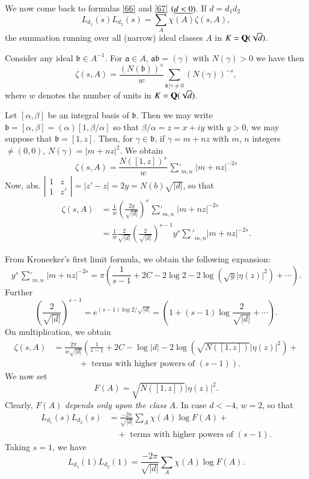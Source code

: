We now come back to formulas \eqref{66} and \eqref{67}
$(\underline{d<0})$. If $d=d_{1}d_{2}$
$$
L_{d_{1}}(s)L_{d_{2}}(s)=\sum_{A}\chi(A)\zeta(s,A),
$$
the summation running over all (narrow) ideal classes $A$ in
$K=\mathbf{Q}(\sqrt{d})$. 

Consider any ideal $\mathfrak{b}\in A^{-1}$. For $\mathfrak{a}\in A$,
$\mathfrak{a}\mathfrak{b}=(\gamma)$ with $N(\gamma)>0$ we have then
$$
\zeta(s,A)=\frac{(N(\mathfrak{b}))^{s}}{w}\sum_{\mathfrak{b}|\gamma\neq
  0}(N(\gamma))^{-s}, 
$$
where $w$ denotes the number of units in $K=\mathbf{Q}(\sqrt{d})$.

Let $[\alpha,\beta]$ be an integral basis of $\mathfrak{b}$. Then we
may write $\mathfrak{b}=[\alpha,\beta]=(\alpha)[1,\beta/\alpha]$ so
that $\beta/\alpha=z=x+iy$ with $y>0$, \ie we may suppose that
$\mathfrak{b}=[1,z]$. Then, for $\gamma\in\mathfrak{b}$, if
$\gamma=m+nz$ with $m$, $n$ integers $\neq (0,0)$,
$N(\gamma)=|m+nz|^{2}$. We obtain
$$
\zeta(s,A)=\frac{N([1,z])^{s}}{w}\mathop{{\sum}'}_{m,n}|m+nz|^{-2s}
$$
Now, abs. $\left|\begin{smallmatrix} 1& z\\ 1 &
z'\end{smallmatrix}\right|=|z'-z|=2y=N(b)\sqrt{|d|}$, so that
\begin{align*}
\zeta(s,A) &=
\frac{1}{w}\left(\frac{2y}{\sqrt{|d|}}\right)^{s}\mathop{{\sum}'}_{m,n}|m+nz|^{-2s}\\
 &=
\frac{1}{w}\frac{2}{\sqrt{|d|}}\left(\frac{2}{\sqrt{|d|}}\right)^{s-1}y^{s}{\mathop{\sum}'}_{m,n}|m+nz|^{-2s}. 
\end{align*}

From Kronecker's first limit formula, we obtain the following
expansion:
$$
y^{s}\mathop{{\sum}'}_{m,n}|m+nz|^{-2s}=\pi\left(\frac{1}{s-1}+2C-2\log
2-2\log(\sqrt{y}|\eta(z)|^{2})+\cdots\right).
$$\pageoriginale
Further
$$
\left(\frac{2}{\sqrt{|d|}}\right)^{s-1}=e^{(s-1)\log
  2/\sqrt{|d|}}=\left(1+(s-1)\log\frac{2}{\sqrt{|d|}}+\cdots\right). 
$$
On multiplication, we obtain
\begin{align*}
\zeta(s,A) &=
\frac{2\pi}{w\sqrt{|d|}}\left(\frac{1}{s-1}+2C-\log|d|-2\log(\sqrt{N([1,z])}|\eta(z)|^{2})+\right.\\
&\left.\qquad\quad +\text{ terms with higher powers of } (s-1)\right).
\end{align*}
We now set
\begin{equation*}
F(A)=\sqrt{N([1,z])}|\eta(z)|^{2}.\tag{$\ast$}
\end{equation*}
Clearly, $F(A)$ {\em depends only upon the class $A$.} In case $d<-4$,
$w=2$, so that
\begin{align*}
L_{d_{1}}(s)L_{d_{2}}(s)&= \frac{-2\pi}{\sqrt{|d|}}\sum_{A}\chi(A)\log
F(A)+\\
&\quad +\text{ terms with higher powers of } (s-1).
\end{align*}
Taking $s=1$, we have
$$
L_{d_{1}}(1)L_{d_{2}}(1)=\frac{-2\pi}{\sqrt{|d|}}\sum_{A}\chi(A)\log F(A).
$$

